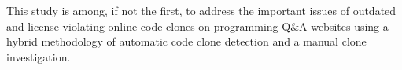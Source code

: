 \documentclass[sigconf,review, anonymous]{acmart}
\newcommand\FIXME[1]{\textbf{FIXME: #1}}
\begin{document}
This study is among, if not the first, to address the important issues
of outdated and license-violating online code clones on programming
Q\&A websites using a hybrid methodology of automatic code clone
detection and a manual clone investigation.

%

  


\end{document}
